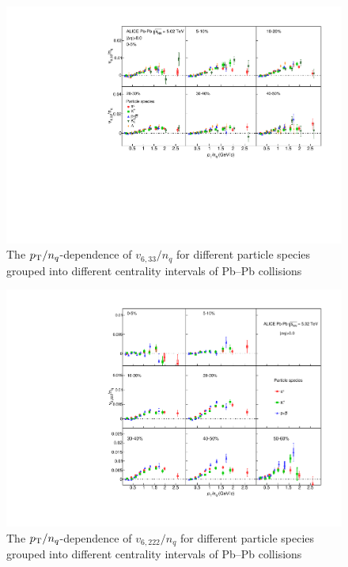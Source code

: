 \documentclass[ALICE,manyauthors]{cernphprep}
\begin{document}
\begin{figure}[!htb]
\begin{center}
\includegraphics[scale=0.82]{figures/scaling/All_v633_gap00_NCQ_3by2.pdf}
\end{center}
\caption{The $p_{\rm{T}}/n_{q}$-dependence of $v_{6,33}/n_{q}$ for different particle species grouped into different centrality intervals of Pb--Pb collisions \sNN}
\label{v633_NCQ}
\end{figure}

\begin{figure}[!htb]
\begin{center}
\includegraphics[scale=0.82]{figures/scaling/All_v6222_gap00_NCQ_3by3.pdf}

\end{center}
\caption{The $p_{\rm{T}}/n_{q}$-dependence of $v_{6,222}/n_{q}$ for different particle species grouped into different centrality intervals of Pb--Pb collisions \sNN}
\label{v6222_NCQ}
\end{figure}
\end{document}
